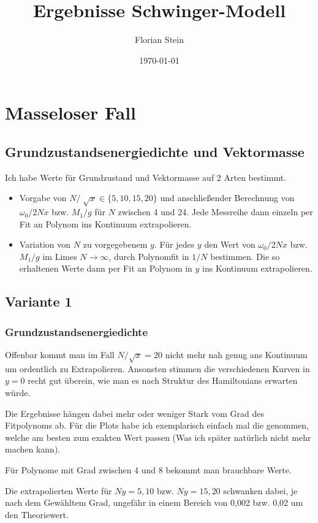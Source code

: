 \documentclass{article}
\title{Ergebnisse Schwinger-Modell}
\author{Florian Stein}
\date{\today}
\begin{document}
	\maketitle

\section{Masseloser Fall}
\subsection{Grundzustandsenergiedichte und Vektormasse}
Ich habe Werte f\"ur Grundzustand und Vektormasse auf 2 Arten bestimmt.
\begin{itemize}
	\item Vorgabe von $N/\sqrt[]{x} \in \{5,10,15,20\}$ und anschlie{\ss}ender Berechnung von $\omega_0/2Nx$ bzw. $M_1/g$ f\"ur $N$ zwischen 4 und 24. Jede Messreihe dann einzeln per Fit an Polynom ins Kontinuum extrapolieren.
	\item Variation von $N$ zu vorgegebenem $y$. F\"ur jedes $y$ den Wert von  $\omega_0/2Nx$ bzw. $M_1/g$ im Limes $N\to \infty$, durch Polynomfit in $1/N$ bestimmen. Die so erhaltenen Werte dann per Fit an Polynom in $y$ ins Kontinuum extrapolieren.
\end{itemize}
 
 \subsection{Variante 1}
 \subsubsection{Grundzustandsenergiedichte}
 Offenbar kommt man im Fall $N/\sqrt{x}=20$ nicht mehr nah genug ans Kontinuum um ordentlich zu Extrapolieren. Ansonsten stimmen die verschiedenen Kurven in $y=0$ recht gut \"uberein, wie man es nach Struktur des Hamiltonians erwarten w\"urde.
 
 Die Ergebnisse h\"angen dabei mehr oder weniger Stark vom Grad des Fitpolynoms ab. F\"ur die Plots habe ich exemplarisch einfach mal die genommen, welche am besten zum exakten Wert passen (Was ich sp\"ater nat\"urlich nicht mehr machen kann).
 
 F\"ur Polynome mit Grad zwischen 4 und 8 bekommt man brauchbare Werte.
 
 Die extrapolierten Werte für $Ny=5,10$ bzw. $Ny=15,20$ schwanken dabei, je nach dem Gew\"ahltem Grad, ungefähr in einem Bereich von 0,002  bzw. 0,02 um den Theoriewert.
 
\end{document}
